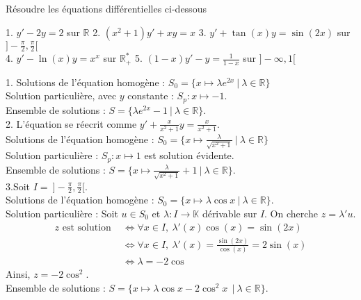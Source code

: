 \documentclass[10pt]{article}
\begin{document}
\begin{tcolorbox}[enhanced, width=7in, center, size=fbox, fontupper=\large, drop shadow southwest]
    Résoudre les équations différentielles ci-dessous
    \begin{center}
        1. $y' - 2y = 2$ sur $\mathbb{R}$ \hspace{0.5cm} 2. $(x^2+1)y'+xy=x$ \hspace{0.5cm} 3. $y' + \tan(x)y = \sin(2x)$ sur $]-\frac{\pi}{2}, \frac{\pi}{2}[$\\
        4. $y'-\ln(x)y = x^x$ sur $\mathbb{R}_+^*$ \hspace{1cm} 5. $(1-x)y' - y = \frac{1}{1-x}$ sur $]-\infty, 1[$
    \end{center}
    1. Solutions de l'équation homogène : $S_0=\{x\mapsto\lambda e^{2x} ~ | ~ \lambda\in\mathbb{R}\}$\\
    Solution particulière, avec $y$ constante : $S_p : x\mapsto -1$.\\
    Ensemble de solutions : $S = \{\lambda e^{2x} - 1 ~ | ~ \lambda\in\mathbb{R}\}$.\\[0.2cm]
    2. L'équation se réecrit comme $y' + \frac{x}{x^2+1}y=\frac{x}{x^2+1}$.\\
    Solutions de l'équation homogène : $S_0 = \{x\mapsto\frac{\lambda}{\sqrt{x^2+1}} ~ | ~ \lambda \in \mathbb{R}\}$\\
    Solution particulière : $S_p:x\mapsto1$ est solution évidente.\\
    Ensemble de solutions : $S = \{x\mapsto\frac{\lambda}{\sqrt{x^2+1}}+1 ~ | ~ \lambda\in\mathbb{R}\}$.\\[0.2cm]
    3.Soit $I = ~ ]-\frac{\pi}{2}, \frac{\pi}{2}[$.\\
    Solutions de l'équation homogène : $S_0 = \{x\mapsto \lambda \cos x ~ | ~ \lambda \in \mathbb{R}\}$.\\
    Solution particulière : Soit $u\in S_0$ et $\lambda:I\rightarrow\mathbb{K}$ dérivable sur $I$. On cherche $z=\lambda'u$.
    \begin{align*}
        z \text{ est solution } &\iff \forall{x\in I}, ~ \lambda'(x)\cos(x) = \sin(2x)\\
        &\iff \forall{x}\in I, ~ \lambda'(x) = \frac{\sin(2x)}{\cos(x)}=2\sin(x)\\
        &\iff \lambda =-2\cos
    \end{align*}
    Ainsi, $z=-2\cos^2$.\\
    Ensemble de solutions : $S = \{x\mapsto \lambda\cos x - 2\cos^2x\ ~ | ~ \lambda \in \mathbb{R}\}$.\\

\end{tcolorbox}
\end{document}
